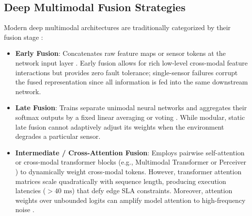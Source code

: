 \documentclass[conference]{IEEEtran}
\begin{document}
\subsection{Deep Multimodal Fusion Strategies}
Modern deep multimodal architectures are traditionally categorized by their fusion stage \cite{baltrusaitis2018multimodal, ramachandram2017deep}:
\begin{itemize}
    \item \textbf{Early Fusion}: Concatenates raw feature maps or sensor tokens at the network input layer \cite{baltrusaitis2018multimodal}. Early fusion allows for rich low-level cross-modal feature interactions but provides zero fault tolerance; single-sensor failures corrupt the fused representation since all information is fed into the same downstream network.
    \item \textbf{Late Fusion}: Trains separate unimodal neural networks and aggregates their softmax outputs by a fixed linear averaging or voting \cite{khaleghi2013multisensor}. While modular, static late fusion cannot adaptively adjust its weights when the environment degrades a particular sensor.
    \item \textbf{Intermediate / Cross-Attention Fusion}: Employs pairwise self-attention or cross-modal transformer blocks (e.g., Multimodal Transformer \cite{tsai2019multimodal} or Perceiver \cite{jaegle2021perceiver}) to dynamically weight cross-modal tokens. However, transformer attention matrices scale quadratically with sequence length, producing execution latencies ($>40\text{ ms}$) that defy edge SLA constraints. Moreover, attention weights over unbounded logits can amplify model attention to high-frequency noise \cite{guo2017calibration}.
\end{itemize}
\end{document}
